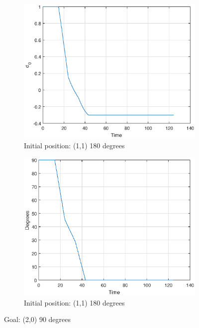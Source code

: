 \begin{figure}[H]
   
    \begin{subfigure}[b]{6cm}
        \includegraphics[width=\textwidth]{task_9_500_d0_initial_11180_Goal_2090.eps}
        \caption{Initial position: (1,1) 180 degrees}
        \label{fig:d0111802090}
    \end{subfigure}
     \begin{subfigure}[b]{6cm}
        \includegraphics[width=\textwidth]{task_9_500_deg_initial_11180_Goal_2090.eps}
        \caption{Initial position: (1,1) 180 degrees}
        \label{fig:deg111802090}
    \end{subfigure}
    \caption{Goal: (2,0) 90 degrees}\label{fig:2090}
\end{figure}



